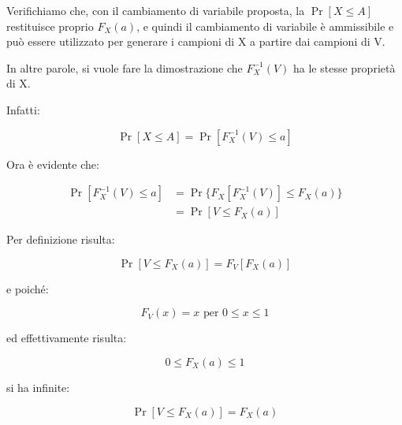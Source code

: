 Verifichiamo che, con il cambiamento di variabile proposta, 
la $\Pr \left[X \le A\right]$ restituisce proprio $F_X (a)$, 
e quindi il cambiamento di variabile è ammissibile e può essere utilizzato per generare i campioni di X a partire dai campioni di V. \newline 

In altre parole, si vuole fare la dimostrazione che $F_X^{-1} (V)$ ha le stesse proprietà di X. \newline 

Infatti: 

{
    \Large 
    \begin{equation}
        \Pr \left[X \le A\right] 
        = 
        \Pr \left[F_X^{-1} (V) \le a\right] 
    \end{equation}
}

Ora è evidente che: 

{
    \Large 
    \begin{equation}
        \begin{split}
            \Pr \left[F_X^{-1} (V) \le a\right] 
            &=
            \Pr
            \{ F_X \left[ F_X^{-1} (V)\right] \le F_X(a)\}
            \\
            &=
            \Pr \left[V \le F_X (a) \right] 
        \end{split}
    \end{equation}
}

Per definizione risulta: 

{
    \Large 
    \begin{equation}
       \Pr \left[V \le F_X (a) \right] 
       = 
       F_V \left[ F_X (a) \right]  
    \end{equation}
}

e poiché: 

{
    \Large 
    \begin{equation}
        F_V (x) = x \text{ per } 0 \le x \le 1
    \end{equation}
}

ed effettivamente risulta: 

{
    \Large 
    \begin{equation}
        0 \le F_X (a) \le 1
    \end{equation}
}

si ha infinite: 

{
    \Large 
    \begin{equation}
         \Pr \left[V \le F_X (a) \right] 
         = 
         F_X (a)
    \end{equation}
}

